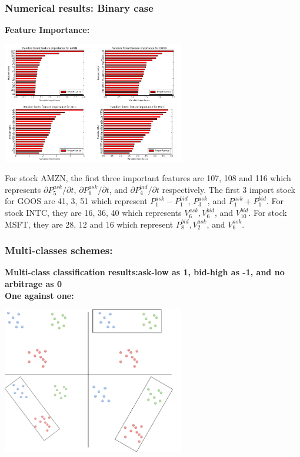 \documentclass[xcolor={x11names,svgnames,dvipsnames}]{beamer}
\begin{document}
\begin{frame}
\frametitle{Numerical results: Binary case}
\textbf{Feature Importance:}

\begin{center}
     \includegraphics[width=0.6\textwidth, height=0.6\textheight]{feature_importance.png}
\end{center} 
\scriptsize{    
For stock AMZN,   the first three important features are 107,   108 and 116 which represents $\partial P_5^{ask}/\partial t$,   $\partial P_6^{ask}/\partial t$,   and $\partial P_4^{bid}/\partial t$ respectively. The first 3 import stock for GOOS are 41,  3,  51 which represent $P_1^{ask}-P_1^{bid}$,   $P_3^{ask}$,   and $P_1^{ask}+P_1^{bid}$. For stock INTC,   they are 16,  36,  40 which represents $V_6^{ask},  V_6^{bid}$,   and $V_{10}^{bid}$. For stock MSFT,   they are 28,  12 and 16 which represent $P_8^{bid},  V_2^{ask}$,   and $V_6^{ask}$.}

\end{frame}


\begin{frame}
\frametitle{Multi-classes schemes:}
\textbf{Multi-class classification results:ask-low as 1, bid-high as -1, and no arbitrage as 0}\\
\textbf{One against one:}
\begin{center}
     \includegraphics[width=0.6\textwidth, height=0.6\textheight]{onevsone.png}
\end{center}     

\end{frame}
\end{document}
